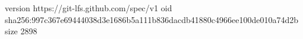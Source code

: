 version https://git-lfs.github.com/spec/v1
oid sha256:997c367e69444038d3e1686b5a111b836dacdb41880c4966ee100de010a74d2b
size 2898

